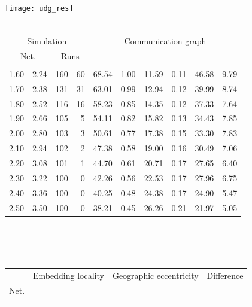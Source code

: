 \documentclass{article}
\begin{document}
\begin{figure}[h]
\begin{center}
\texttt{[image: udg\_res]}
~\\~\\
\begin{tabular}{|rr|rr|rr|rr|rr|}
\hline
\multicolumn{4}{|c|}{Simulation} & \multicolumn{6}{|c|}{Communication graph}\\
\multicolumn{2}{|c}{Net.} & \multicolumn{2}{c|}{Runs} & \multicolumn{2}{|c}{} & \multicolumn{2}{c}{} & \multicolumn{2}{c|}{}\\
\hline
\multicolumn{1}{|c}{} & \multicolumn{1}{c|}{} & \multicolumn{1}{|c}{} & \multicolumn{1}{c|}{} & \multicolumn{1}{|c}{} & \multicolumn{1}{c|}{} & \multicolumn{1}{|c}{} & \multicolumn{1}{c|}{} & \multicolumn{1}{|c}{} & \multicolumn{1}{c|}{}\\
1.60 & 2.24 & 160 & 60 & 68.54 & 1.00 & 11.59 & 0.11 & 46.58 & 9.79\\
1.70 & 2.38 & 131 & 31 & 63.01 & 0.99 & 12.94 & 0.12 & 39.99 & 8.74\\
1.80 & 2.52 & 116 & 16 & 58.23 & 0.85 & 14.35 & 0.12 & 37.33 & 7.64\\
1.90 & 2.66 & 105 &  5 & 54.11 & 0.82 & 15.82 & 0.13 & 34.43 & 7.85\\
2.00 & 2.80 & 103 &  3 & 50.61 & 0.77 & 17.38 & 0.15 & 33.30 & 7.83\\
2.10 & 2.94 & 102 &  2 & 47.38 & 0.58 & 19.00 & 0.16 & 30.49 & 7.06\\
2.20 & 3.08 & 101 &  1 & 44.70 & 0.61 & 20.71 & 0.17 & 27.65 & 6.40\\
2.30 & 3.22 & 100 &  0 & 42.26 & 0.56 & 22.53 & 0.17 & 27.96 & 6.75\\
2.40 & 3.36 & 100 &  0 & 40.25 & 0.48 & 24.38 & 0.17 & 24.90 & 5.47\\
2.50 & 3.50 & 100 &  0 & 38.21 & 0.45 & 26.26 & 0.21 & 21.97 & 5.05\\
\hline
\end{tabular}\\
~\\~\\
\begin{tabular}{|r|rr|rr|rr|rr|rr|}
\hline
& \multicolumn{4}{|c|}{Embedding locality} & \multicolumn{4}{|c|}{Geographic eccentricity} & \multicolumn{2}{|c|}{Difference}\\
Net. & \multicolumn{2}{c}{} & \multicolumn{2}{c|}{} & \multicolumn{2}{c}{} & \multicolumn{2}{c|}{}&  & \\
\hline
\multicolumn{1}{|c|}{} & \multicolumn{1}{|c}{} & \multicolumn{1}{c|}{} & \multicolumn{1}{|c}{} & \multicolumn{1}{c|}{} & \multicolumn{1}{|c}{} & \multicolumn{1}{c|}{} & \multicolumn{1}{|c}{} & \multicolumn{1}{c|}{} & \multicolumn{1}{|c}{} & \multicolumn{1}{c|}{}\\

\end{tabular}
\end{center}
\end{figure}
\end{document}
